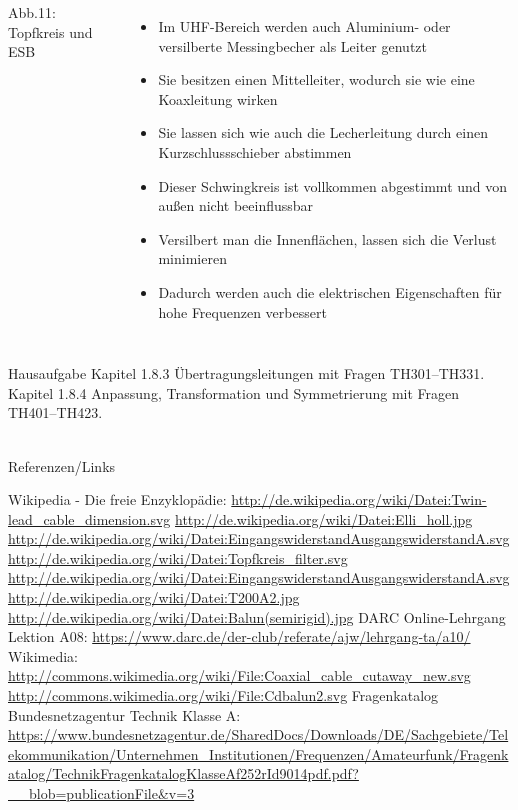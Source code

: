 \begin{frame}
\begin{columns}
    {\tiny Abb.11: Topfkreis und ESB}
    \begin{itemize}
      \item Im UHF-Bereich werden auch Aluminium- oder versilberte Messingbecher als Leiter genutzt
      \item Sie besitzen einen Mittelleiter, wodurch sie wie eine Koaxleitung wirken
      \item Sie lassen sich wie auch die Lecherleitung durch einen Kurzschlussschieber abstimmen
      \item Dieser Schwingkreis ist vollkommen abgestimmt und von außen nicht beeinflussbar
      \item Versilbert man die Innenflächen, lassen sich die Verlust minimieren
      \item Dadurch werden auch die elektrischen Eigenschaften für hohe Frequenzen verbessert
    \end{itemize}
  \end{columns}
\end{frame}

\begin{frame}
  \begin{exampleblock}{Hausaufgabe}
    Kapitel 1.8.3 Übertragungsleitungen mit Fragen TH301--TH331.\\
    Kapitel 1.8.4 Anpassung, Transformation und Symmetrierung mit Fragen TH401--TH423.\\
  \end{exampleblock}
\end{frame}

\renewcommand{\refname}{Referenzen}

\hypertarget{refs}{}
\textcolor{white}{} \\ %
\Large Referenzen/Links
\footnotesize

\begin{thebibliography}{}
      Wikipedia - Die freie Enzyklopädie:
    \url{http://de.wikipedia.org/wiki/Datei:Twin-lead_cable_dimension.svg}
    \url{http://de.wikipedia.org/wiki/Datei:Elli_holl.jpg}
    \url{http://de.wikipedia.org/wiki/Datei:EingangswiderstandAusgangswiderstandA.svg}
    \url{http://de.wikipedia.org/wiki/Datei:Topfkreis_filter.svg}
    \url{http://de.wikipedia.org/wiki/Datei:EingangswiderstandAusgangswiderstandA.svg}
    \url{http://de.wikipedia.org/wiki/Datei:T200A2.jpg}
    \url{http://de.wikipedia.org/wiki/Datei:Balun(semirigid).jpg}
    DARC Online-Lehrgang Lektion A08:
    \url{https://www.darc.de/der-club/referate/ajw/lehrgang-ta/a10/}
    Wikimedia:
    \url{http://commons.wikimedia.org/wiki/File:Coaxial_cable_cutaway_new.svg}
    \url{http://commons.wikimedia.org/wiki/File:Cdbalun2.svg}
     Fragenkatalog Bundesnetzagentur Technik Klasse A:
    \mbox{\url{https://www.bundesnetzagentur.de/SharedDocs/Downloads/DE/Sachgebiete/Telekommunikation/Unternehmen_Institutionen/Frequenzen/Amateurfunk/Fragenkatalog/TechnikFragenkatalogKlasseAf252rId9014pdf.pdf?__blob=publicationFile&v=3}}
\end{thebibliography}


